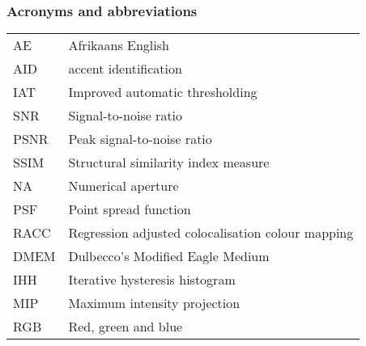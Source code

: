 \newpage
\subsubsection*{Acronyms and abbreviations}

\begingroup
\renewcommand{\arraystretch}{1.2}
\begin{tabular}{@{}p{2.5cm} l}
    AE      & Afrikaans English \\
    AID     & accent identification \\
    IAT		& Improved automatic thresholding \\
    SNR		& Signal-to-noise ratio	\\
    PSNR	& Peak signal-to-noise ratio \\
    SSIM	& Structural similarity index measure \\
    NA		& Numerical aperture	\\
    PSF		& Point spread function	\\
    RACC	& Regression adjusted colocalisation colour mapping	\\
    DMEM	& Dulbecco's Modified Eagle Medium \\ %
    IHH		& Iterative hysteresis histogram	\\
    MIP		& Maximum intensity projection		\\
    RGB		& Red, green and blue
    
\end{tabular}
\endgroup
